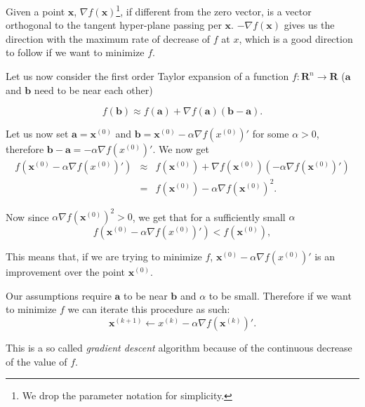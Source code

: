 \documentclass{sapthesis}
\begin{document}

Given a point $\mathbf x$, $\nabla f(\mathbf x)$\footnote{We drop the parameter
notation for simplicity.}, if different from the zero vector, is a vector
orthogonal to the tangent hyper-plane passing per $\mathbf x$. $-\nabla f
(\mathbf x)$ gives us the direction with the maximum rate of decrease of $f$ at
$x$, which is a good direction to follow if we want to minimize $f$.

Let us now consider the first order Taylor expansion of a function $f:\mathbf
R^n \to \mathbf R$ ($\mathbf a$ and $\mathbf b$ need to be near each other)

\begin{displaymath}
	f(\mathbf b) \approx f(\mathbf a) + \nabla f(\mathbf a)(\mathbf b - \mathbf a) \mathrm .
\end{displaymath}

Let us now set $\mathbf a = \mathbf x^{(0)}$ and $\mathbf b = \mathbf x^{(0)} -
\alpha\nabla f(x^{(0)})'$ for some $\alpha > 0$, therefore $\mathbf b - \mathbf
a = -\alpha\nabla f(x^{(0)})'$. We now get
\begin{eqnarray*}
	f(\mathbf x^{(0)} - \alpha\nabla f(x^{(0)})')
	&\approx& f(\mathbf x^{(0)}) + \nabla f(\mathbf x^{(0)})(-\alpha\nabla f(\mathbf x^{(0)})') \\
	&=& f(\mathbf x^{(0)}) - \alpha\nabla f(\mathbf x^{(0)})^2 \mathrm .
\end{eqnarray*}

Now since $\alpha\nabla f(\mathbf x^{(0)})^2 > 0$, we get that for a
sufficiently small $\alpha$
\begin{displaymath}
	f(\mathbf x^{(0)} - \alpha\nabla f(x^{(0)})') < f(\mathbf x^{(0)}) \mathrm ,
\end{displaymath}

This means that, if we are trying to minimize $f$, $\mathbf x^{(0)} -
\alpha\nabla f(x^{(0)})'$ is an improvement over the point $\mathbf x^{(0)}$.

Our assumptions require $\mathbf a$ to be near $\mathbf b$ and $\alpha$ to be
small. Therefore if we want to minimize $f$ we can iterate this procedure as
such:
\begin{displaymath}
	\mathbf x^{(k+1)} \leftarrow x^{(k)} - \alpha\nabla f(\mathbf x^{(k)})' \mathrm .
\end{displaymath}

This is a so called \emph{gradient descent} algorithm because of the continuous
decrease of the value of $f$.
\end{document}
